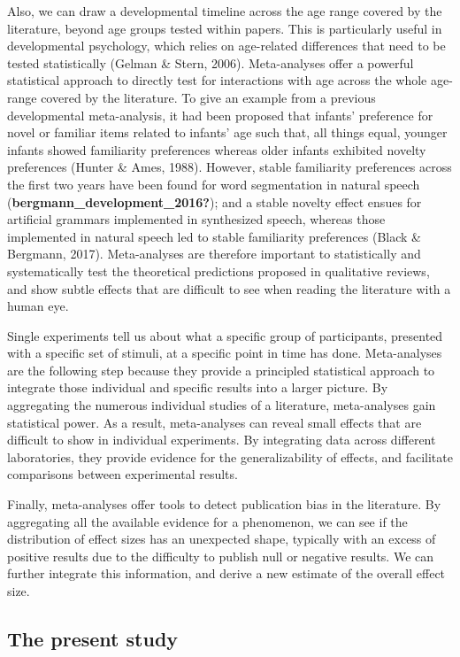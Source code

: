 \documentclass[
  english,
  man]{apa6}
\begin{document}
Also, we can draw a developmental timeline across the age range covered by the literature, beyond age groups tested within papers. This is particularly useful in developmental psychology, which relies on age-related differences that need to be tested statistically (Gelman \& Stern, 2006). Meta-analyses offer a powerful statistical approach to directly test for interactions with age across the whole age-range covered by the literature. To give an example from a previous developmental meta-analysis, it had been proposed that infants' preference for novel or familiar items related to infants' age such that, all things equal, younger infants showed familiarity preferences whereas older infants exhibited novelty preferences (Hunter \& Ames, 1988). However, stable familiarity preferences across the first two years have been found for word segmentation in natural speech (\textbf{bergmann\_development\_2016?}); and a stable novelty effect ensues for artificial grammars implemented in synthesized speech, whereas those implemented in natural speech led to stable familiarity preferences (Black \& Bergmann, 2017). Meta-analyses are therefore important to statistically and systematically test the theoretical predictions proposed in qualitative reviews, and show subtle effects that are difficult to see when reading the literature with a human eye.

Single experiments tell us about what a specific group of participants, presented with a specific set of stimuli, at a specific point in time has done. Meta-analyses are the following step because they provide a principled statistical approach to integrate those individual and specific results into a larger picture. By aggregating the numerous individual studies of a literature, meta-analyses gain statistical power. As a result, meta-analyses can reveal small effects that are difficult to show in individual experiments. By integrating data across different laboratories, they provide evidence for the generalizability of effects, and facilitate comparisons between experimental results.

Finally, meta-analyses offer tools to detect publication bias in the literature. By aggregating all the available evidence for a phenomenon, we can see if the distribution of effect sizes has an unexpected shape, typically with an excess of positive results due to the difficulty to publish null or negative results. We can further integrate this information, and derive a new estimate of the overall effect size.

\hypertarget{the-present-study}{%
\subsection{The present study}\label{the-present-study}}
\end{document}

